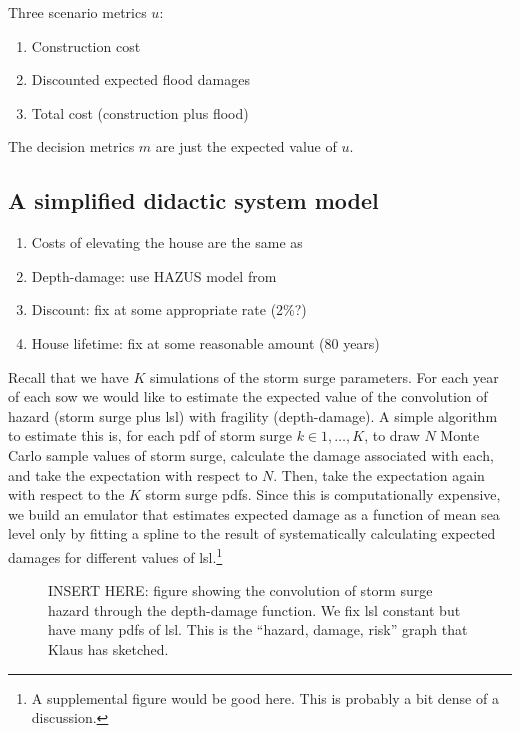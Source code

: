 \documentclass[12pt]{article}
\begin{document}
Three scenario metrics $u$:
\begin{enumerate}
    \item Construction cost
    \item Discounted expected flood damages
    \item Total cost (construction plus flood)
\end{enumerate}
The decision metrics $m$ are just the expected value of $u$.

\subsection{A simplified didactic system model}

\begin{enumerate}
    \item Costs of elevating the house are the same as \citet{zarekarizi_suboptimal:2020}
    \item Depth-damage: use HAZUS model from \citet{zarekarizi_suboptimal:2020}
    \item Discount: fix at some appropriate rate (2\%?)
    \item House lifetime: fix at some reasonable amount (80 years)
\end{enumerate}

Recall that we have $K$ simulations of the storm surge parameters.
For each year of each \gls{sow} we would like to estimate the expected value of the convolution of hazard (storm surge plus \gls{lsl}) with fragility (depth-damage).
A simple algorithm to estimate this is, for each \gls{pdf} of storm surge $k \in 1, \ldots, K$, to draw $N$ Monte Carlo sample values of storm surge, calculate the damage associated with each, and take the expectation with respect to $N$.
Then, take the expectation again with respect to the $K$ storm surge \glspl{pdf}.
Since this is computationally expensive, we build an emulator that estimates expected damage as a function of mean sea level only by fitting a spline to the result of systematically calculating expected damages for different values of \gls{lsl}.\footnote{A supplemental figure would be good here. This is probably a bit dense of a discussion.}

\begin{figure}
    \caption{
        INSERT HERE: figure showing the convolution of storm surge hazard through the depth-damage function.
        We fix \gls{lsl} constant but have many \glspl{pdf} of \gls{lsl}.
        This is the ``hazard, damage, risk'' graph that Klaus has sketched.
    }
\end{figure}
\end{document}
